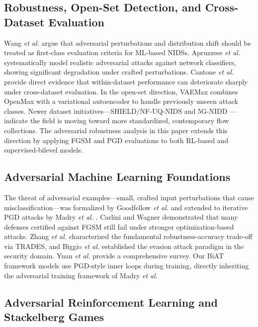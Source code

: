 \subsection{Robustness, Open-Set Detection, and Cross-Dataset Evaluation}

Wang \emph{et al.} \cite{wang2023robustnessnids} argue that adversarial perturbations and distribution shift should be treated as first-class evaluation criteria for ML-based NIDSs. Apruzzese \emph{et al.} \cite{apruzzese2022adversarial_nids} systematically model realistic adversarial attacks against network classifiers, showing significant degradation under crafted perturbations. Cantone \emph{et al.} \cite{cantone2024crossdataset} provide direct evidence that within-dataset performance can deteriorate sharply under cross-dataset evaluation. In the open-set direction, VAEMax \cite{qiu2024vaemax} combines OpenMax with a variational autoencoder to handle previously unseen attack classes. Newer dataset initiatives---SHIELD/NF-UQ-NIDS \cite{shield2025, sarhan2021nfuqnids} and 5G-NIDD \cite{siriwardhana2025nidd}---indicate the field is moving toward more standardized, contemporary flow collections. The adversarial robustness analysis in this paper extends this direction by applying FGSM \cite{goodfellow2015fgsm} and PGD \cite{madry2018pgd} evaluations to both RL-based and supervised-bilevel models.

\subsection{Adversarial Machine Learning Foundations}

The threat of adversarial examples---small, crafted input perturbations that cause misclassification---was formalized by Goodfellow \emph{et al.} \cite{goodfellow2015fgsm} and extended to iterative PGD attacks by Madry \emph{et al.} \cite{madry2018pgd}. Carlini and Wagner \cite{carlini2017cw} demonstrated that many defenses certified against FGSM still fail under stronger optimization-based attacks. Zhang \emph{et al.} \cite{zhang2019trades} characterized the fundamental robustness-accuracy trade-off via TRADES, and Biggio \emph{et al.} \cite{biggio2013evasion} established the evasion attack paradigm in the security domain. Yuan \emph{et al.} \cite{yuan2019adv_survey} provide a comprehensive survey. Our BiAT framework models use PGD-style inner loops during training, directly inheriting the adversarial training framework of Madry \emph{et al.}

\subsection{Adversarial Reinforcement Learning and Stackelberg Games}

